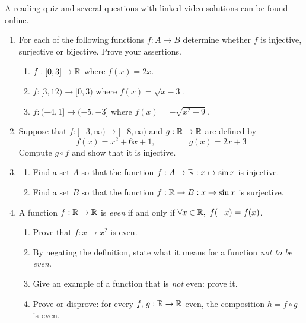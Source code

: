 \goodbreak



\begin{exercises}
	A reading quiz and several questions with linked video solutions can be found \href{http://www.math.uci.edu/~ndonalds/math13/selftest/4-3-functions.html}{online}.

	\begin{enumerate}
	  \item For each of the following functions $f:A\to B$ determine whether $f$ is injective, surjective or bijective. Prove your assertions.
	  \begin{enumerate}
	    \item $f:[0,3]\to\mathbb{R}$ where $f(x)=2x$.
	    \item $f:[3,12)\to[0,3)$ where $f(x)=\sqrt{x-3}$.
	    \item $f:(-4,1]\to(-5,-3]$ where $f(x)=-\sqrt{x^2+9}$.
	  \end{enumerate}
	  
	  
	  \item Suppose that $f:[-3,\infty)\to[-8,\infty)$ and $g:\mathbb{R}\to\mathbb{R}$ are defined by
		\[
			f(x)=x^2+6x+1,\qquad\qquad g(x)=2x+3
		\]
		Compute $g\circ f$ and show that it is injective.
	  
	  
	  \item\begin{enumerate}
			\item Find a set $A$ so that the function $f:A\to\mathbb{R}:x\mapsto\sin x$ is injective.
			\item Find a set $B$ so that the function $f:\mathbb{R}\to B:x\mapsto\sin x$ is surjective.
		\end{enumerate}
	

	  \item A function $f:\mathbb{R}\to\mathbb{R}$ is \emph{even} if and only if $\forall x\in\R,\ f(-x)=f(x)$.
		\begin{enumerate}
			\item Prove that $f:x\mapsto x^2$ is even.
			\item By negating the definition, state what it means for a function \emph{not to be even.}
			\item Give an example of a function that is \emph{not} even: prove it. 
			\item Prove or disprove: for every $f,\,g:\mathbb{R}\to\mathbb{R}$ even, the composition $h=f\circ g$ is even.
		\end{enumerate}
		

\end{enumerate}
\end{exercises}
